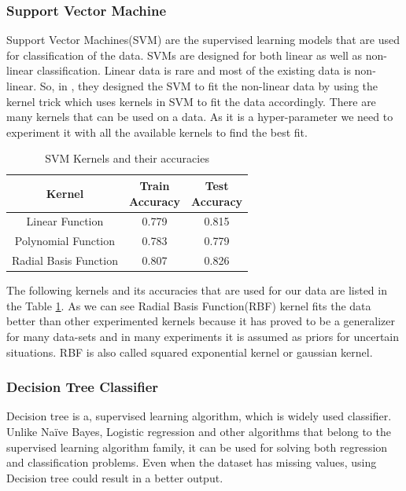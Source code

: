 \documentclass[conference]{IEEEtran}
\begin{document}
\subsubsection*{Support Vector Machine}
Support Vector Machines(SVM) are the supervised learning models that are used for classification of the data. SVMs are designed for both linear as well as non-linear classification. Linear data is rare and most of the existing data is non-linear. So, in \cite{svm}, they designed the SVM to fit the non-linear data by using the kernel trick which uses kernels in SVM to fit the data accordingly. There are many kernels that can be used on a data. As it is a hyper-parameter we need to experiment it with all the available kernels to find the best fit.
\begin{table}[ht]
\centering
 \begin{tabular}{|c| c c|} 
 \hline
 Kernel  & \thead{Train \\ Accuracy} & \thead{Test \\ Accuracy} \\ [0.5ex] 
 \hline
 Linear Function & 0.779 & 0.815\\ 

 Polynomial Function & 0.783 & 0.779\\
 
 Radial Basis Function & 0.807 & 0.826\\
 \hline
\end{tabular}
\vspace*{0.25cm}
\caption{SVM Kernels and their accuracies}
\label{table:svm}
\end{table}
\par
The following kernels and its accuracies that are used for our data are listed in the Table \ref{table:svm}. As we can see Radial Basis Function(RBF) kernel fits the data better than other experimented kernels because it has proved to be a generalizer for many data-sets and in many experiments it is assumed as priors for uncertain situations. RBF is also called squared exponential kernel or gaussian kernel.            


\subsubsection*{Decision Tree Classifier}
Decision tree is a, supervised learning algorithm, which is widely used classifier. Unlike Naïve Bayes, Logistic regression and other algorithms that belong to the supervised learning algorithm family, it can be used for solving both regression and classification problems. Even when the dataset has missing values, using Decision tree could result in a better output.
\par
\end{document}
